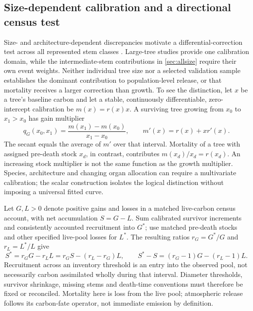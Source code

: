 \documentclass[11pt,a4paper]{article}
\theoremstyle{remark}
\begin{document}
\subsection{Size-dependent calibration and a directional census test}\label{sec:size}
Size- and architecture-dependent discrepancies motivate a differential-correction test across all represented stem classes \citep{Arellano2016,Vasquez2012,Gonzalez2018}. Large-tree studies provide one calibration domain, while the intermediate-stem contributions in \cref{sec:allsize} require their own event weights. Neither individual tree size nor a selected validation sample establishes the dominant contribution to population-level release, or that mortality receives a larger correction than growth. To see the distinction, let $x$ be a tree's baseline carbon and let a stable, continuously differentiable, zero-intercept calibration be $m(x)=r(x)x$. A surviving tree growing from $x_0$ to $x_1>x_0$ has gain multiplier
\begin{equation}
 q_G(x_0,x_1)=\frac{m(x_1)-m(x_0)}{x_1-x_0},
 \qquad m'(x)=r(x)+xr'(x).
 \label{eq:marginalcorrection}
\end{equation}
The secant equals the average of $m'$ over that interval. Mortality of a tree with assigned pre-death stock $x_d$, in contrast, contributes $m(x_d)/x_d=r(x_d)$. An increasing stock multiplier is not the same function as the growth multiplier. Species, architecture and changing organ allocation can require a multivariate calibration; the scalar construction isolates the logical distinction without imposing a universal fitted curve.

Let $G,L>0$ denote positive gains and losses in a matched live-carbon census account, with net accumulation $S=G-L$. Sum calibrated survivor increments and consistently accounted recruitment into $G^*$; use matched pre-death stocks and other specified live-pool losses for $L^*$. The resulting ratios $r_G=G^*/G$ and $r_L=L^*/L$ give
\begin{equation}
 S^*=r_GG-r_LL
     =r_GS-(r_L-r_G)L,\qquad
 S^*-S=(r_G-1)G-(r_L-1)L.
 \label{eq:censussink}
\end{equation}
Recruitment across an inventory threshold is an entry into the observed pool, not necessarily carbon assimilated wholly during that interval. Diameter thresholds, survivor shrinkage, missing stems and death-time conventions must therefore be fixed or reconciled. Mortality here is loss from the live pool; atmospheric release follows its carbon-fate operator, not immediate emission by definition.
\end{document}
